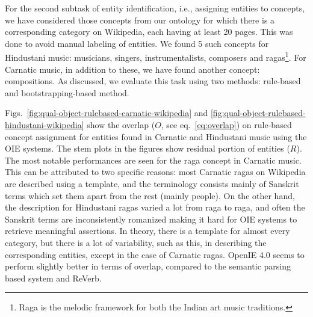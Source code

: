 \documentclass{llncs}
\begin{document}
For the second subtask of entity identification, i.e., assigning entities to concepts, we have considered those concepts from our ontology for which there is a corresponding category on Wikipedia, each having at least 20 pages. This was done to avoid manual labeling of entities. We found 5 such concepts for Hindustani music: musicians, singers, instrumentalists, composers and ragas\footnote{Raga is the melodic framework for both the Indian art music traditions.}. For Carnatic music, in addition to these, we have found another concept: compositions. As discussed, we evaluate this task using two methods: rule-based and bootstrapping-based method.

Figs.~\ref{fig:qual-object-rulebased-carnatic-wikipedia} and \ref{fig:qual-object-rulebased-hindustani-wikipedia} show the overlap ($O$, see eq.~\ref{eq:overlap}) on rule-based concept assignment for entities found in Carnatic and Hindustani music using the OIE systems. The stem plots in the figures show residual portion of entities ($R$). The most notable performances are seen for the raga concept in Carnatic music. This can be attributed to two specific reasons: most Carnatic ragas on Wikipedia are described using a template, and the terminology consists mainly of Sanskrit terms which set them apart from the rest (mainly people). On the other hand, the description for Hindustani ragas varied a lot from raga to raga, and often the Sanskrit terms are inconsistently romanized making it hard for OIE systems to retrieve meaningful assertions. In theory, there is a template for almost every category, but there is a lot of variability, such as this, in describing the corresponding entities, except in the case of Carnatic ragas. OpenIE 4.0 seems to perform slightly better in terms of overlap, compared to the semantic parsing based system and ReVerb.
\end{document}
